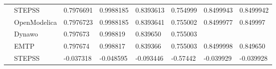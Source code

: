 \documentclass{report}
\begin{document}
\begin{table}[H]
\begin{tabular}{ll|l|l|l|l|l|l}
\multicolumn{1}{l|}{\parbox[t]{2mm}{}} & STEPSS       & 0.7976691                                                                         & 0.9988185                                                                         & 0.8393613                                                                         & 0.754999                                                                          & 0.8499943                                                                         & 0.8499942                                                                        \\
\multicolumn{1}{l|}{}                              & OpenModelica & 0.7976723                                                                         & 0.9988185                                                                         & 0.8393641                                                                         & 0.755002                                                                          & 0.8499977                                                                         & 0.849997                                                                         \\
\multicolumn{1}{l|}{}                              & Dynawo       & 0.797673                                                                          & 0.998819                                                                          & 0.839650                                                                          & 0.755003                                                                          &                                                                                   &                                                                                  \\
\multicolumn{1}{l|}{}                              & EMTP         & 0.797674                                                                          & 0.998817                                                                          & 0.839366                                                                          & 0.755003                                                                          & 0.8499998                                                                         & 0.849650                                                                         \\ \hline
\multicolumn{1}{l|}{\parbox[t]{2mm}{}} & STEPSS       & -0.037318                                                                         & -0.048595                                                                         & -0.093446                                                                         & -0.57442                                                                          & -0.039929                                                                         & -0.039928                                                                        \\

\end{tabular}
\end{table}
\end{document}

